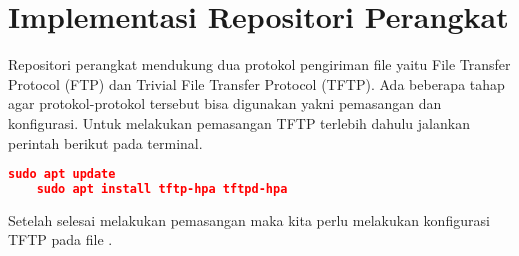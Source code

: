     \section{Implementasi Repositori Perangkat}
    	Repositori perangkat mendukung dua protokol pengiriman file yaitu File Transfer Protocol (FTP) dan Trivial File Transfer Protocol (TFTP). Ada beberapa tahap agar protokol-protokol tersebut bisa digunakan yakni pemasangan dan konfigurasi. Untuk melakukan pemasangan TFTP terlebih dahulu jalankan perintah berikut pada terminal.
	\begin{lstlisting}[frame=single,tabsize=2,breaklines,caption={Perintah untuk pemasangan TFTP },label=nonrootuser, captionpos=b, language=json,numbers=none]
	sudo apt update 
	sudo apt install tftp-hpa tftpd-hpa
	\end{lstlisting}
    	Setelah selesai melakukan pemasangan maka kita perlu melakukan konfigurasi TFTP pada file .

